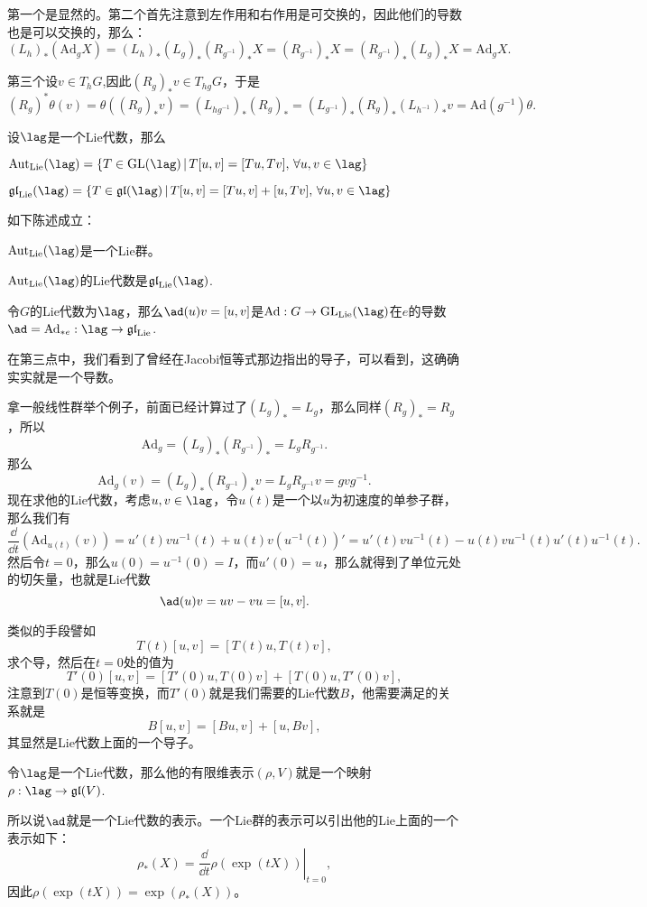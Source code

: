 第一个是显然的。第二个首先注意到左作用和右作用是可交换的，因此他们的导数也是可以交换的，那么：
\[
	(L_h)_*(\mathrm{Ad}_gX)=(L_h)_*(L_g)_*(R_{g^{-1}})_*X=(R_{g^{-1}})_*X=(R_{g^{-1}})_*(L_g)_*X=\mathrm{Ad}_gX.
\]

第三个设$v\in T_hG$,因此$(R_g)_*v\in T_{hg}G$，于是
\[
	(R_g)^*\theta(v)=\theta((R_g)_*v)=(L_{{hg}^{-1}})_*(R_g)_*
	=(L_{{g}^{-1}})_*(R_g)_*(L_{{h}^{-1}})_*v=\mathrm{Ad}(g^{-1})\theta.
\]

\begin{defi}
设$\lag$是一个Lie代数，那么

 $\mathrm{Aut}_{\mathrm{Lie}}(\lag)=\{T\in \mathrm{GL}(\lag)\,|\,T[u,v]=[Tu,Tv],\,\forall u,v\in\lag\}$

 $\mathfrak{gl}_{\mathrm{Lie}}(\lag)=\{T\in \mathfrak{gl}(\lag)\,|\,T[u,v]=[Tu,v]+[u,Tv],\,\forall u,v\in\lag\}$
\end{defi}

\begin{pro}如下陈述成立：

 $\mathrm{Aut}_{\mathrm{Lie}}(\lag)$是一个Lie群。

 $\mathrm{Aut}_{\mathrm{Lie}}(\lag)$的Lie代数是$\mathfrak{gl}_{\mathrm{Lie}}(\lag)$.

 令$G$的Lie代数为$\lag$，那么$\ad(u)v=[u,v]$是$\mathrm{Ad}:G\to \mathrm{GL}_{\mathrm{Lie}}(\lag)$在$e$的导数$\ad=\mathrm{Ad}_{*e}:\lag\to \mathfrak{gl}_{\mathrm{Lie}}$.
\end{pro}

在第三点中，我们看到了曾经在Jacobi恒等式那边指出的导子，可以看到，这确确实实就是一个导数。

拿一般线性群举个例子，前面已经计算过了$(L_g)_*=L_g$，那么同样$(R_g)_*=R_g$，所以
\[
	\mathrm{Ad}_g=(L_g)_*(R_{g^{-1}})_*=L_gR_{g^{-1}}.
\]
那么
\[
	\mathrm{Ad}_g(v)=(L_g)_*(R_{g^{-1}})_*v=L_gR_{g^{-1}}v=gvg^{-1}.
\]
现在求他的Lie代数，考虑$u,v\in \lag$，令$u(t)$是一个以$u$为初速度的单参子群，那么我们有
\[
\frac{\dd}{\dd t}(\mathrm{Ad}_{u(t)}(v))=u'(t)vu^{-1}(t)+u(t)v(u^{-1}(t))'=u'(t)vu^{-1}(t)-u(t)vu^{-1}(t)u'(t)u^{-1}(t).
\]
然后令$t=0$，那么$u(0)=u^{-1}(0)=I$，而$u'(0)=u$，那么就得到了单位元处的切矢量，也就是Lie代数
\[
\ad(u)v=uv-vu=[u,v].
\]

类似的手段譬如
\[
T(t)[u,v]=[T(t)u,T(t)v],
\]
求个导，然后在$t=0$处的值为
\[
T'(0)[u,v]=[T'(0)u,T(0)v]+[T(0)u,T'(0)v],
\]
注意到$T(0)$是恒等变换，而$T'(0)$就是我们需要的Lie代数$B$，他需要满足的关系就是
\[
B[u,v]=[Bu,v]+[u,Bv],
\]
其显然是Lie代数上面的一个导子。

\begin{defi}
令$\lag$是一个Lie代数，那么他的有限维表示$(\rho,V)$就是一个映射$\rho:\lag\to\mathfrak{gl}(V)$.
\end{defi}

所以说$\ad$就是一个Lie代数的表示。一个Lie群的表示可以引出他的Lie上面的一个表示如下：
\[
	\rho_*(X)=\left.\frac{\dd}{\dd t}\rho(\exp(tX))\right|_{t=0},
\]
因此$\rho(\exp(tX))=\exp(\rho_*(X))$。
